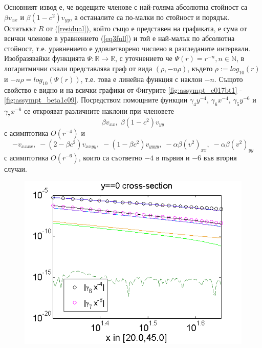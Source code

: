\documentclass[a4paper]{article}
\newcommand{\rf}[1]{(\ref{#1})}
\newcommand{\RR}{\mathbb{R}}
\theoremstyle{remark}
\begin{document}
\begin{large}
Основният извод е, че водещите членове с най-голяма абсолютна стойност са $\beta v_{xx}$ и $\beta (1-c^2) v_{yy}$, а останалите са по-малки по стойност и порядък. Остатъкът $R$ от \rf{residual}, който също е представен на графиката, е сума от всички членове в уравнението \rf{eq3full} и той е най-малък по абсолютна стойност, т.е. уравнението е удовлетворено числено в разгледаните интервали. 
Изобразявайки функцията $\Psi : \RR \rightarrow \RR$, с уточнението че $\Psi(r) = r^{-n}, n \in \mathbb{N}$, в логаритмични скали представлява граф от вида $(\rho, -n \rho )$, където $\rho := log_{10}(r)$ и $ -n \rho = log_{10}( \Psi(r) ) $, т.е. това е линейна функция с наклон $-n$. Същото свойство е видно и на всички графики от Фигурите \ref{fig:assympt_c017bt1} - \ref{fig:assympt_beta1c09}. Посредством помощните функции $\gamma_4 y^{-4}$, $\gamma_6 x^{-4}$, $\gamma_5 y^{-6}$ и $\gamma_7 x^{-6}$ се открояват различните наклони при членовете 
$$
\beta v_{xx}, \; \beta (1-c^2) v_{yy}
$$ 
с асимптотика $O(r^{-4})$ и 
$$
- v_{xxxx}, \;  - (2-\beta c^2)v_{xxyy},  \;  - (1-\beta c^2)v_{yyyy}, \;  - \alpha \beta (v^2)_{xx}, \; - \alpha \beta (v^2)_{yy}
$$
с асимптотика $O(r^{-6})$, които са съответно $-4$ в първия и $-6$ във втория случаи.
\begin{figure}[ht]
	\begin{minipage}[b]{0.95\linewidth}
		\includegraphics[width=\linewidth]{AssymptForEachTerm/c017_bt1_5/ChristovIC_AlongX_50_ZB2_bt1_c017_h020_O(h^6).png}
	\end{minipage}
	\begin{minipage}[b]{0.95\linewidth}

\end{minipage}
\end{figure}
\end{large}
\end{document}
